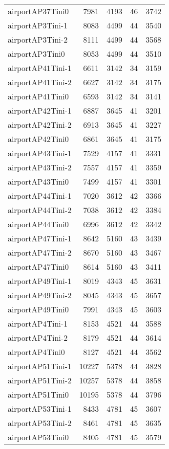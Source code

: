 \begin{longtable}{lrrrr}
airportAP37Tini0 & 7981 & 4193 & 46 & 3742 \\
airportAP3Tini-1 & 8083 & 4499 & 44 & 3540 \\
airportAP3Tini-2 & 8111 & 4499 & 44 & 3568 \\
airportAP3Tini0 & 8053 & 4499 & 44 & 3510 \\
airportAP41Tini-1 & 6611 & 3142 & 34 & 3159 \\
airportAP41Tini-2 & 6627 & 3142 & 34 & 3175 \\
airportAP41Tini0 & 6593 & 3142 & 34 & 3141 \\
airportAP42Tini-1 & 6887 & 3645 & 41 & 3201 \\
airportAP42Tini-2 & 6913 & 3645 & 41 & 3227 \\
airportAP42Tini0 & 6861 & 3645 & 41 & 3175 \\
airportAP43Tini-1 & 7529 & 4157 & 41 & 3331 \\
airportAP43Tini-2 & 7557 & 4157 & 41 & 3359 \\
airportAP43Tini0 & 7499 & 4157 & 41 & 3301 \\
airportAP44Tini-1 & 7020 & 3612 & 42 & 3366 \\
airportAP44Tini-2 & 7038 & 3612 & 42 & 3384 \\
airportAP44Tini0 & 6996 & 3612 & 42 & 3342 \\
airportAP47Tini-1 & 8642 & 5160 & 43 & 3439 \\
airportAP47Tini-2 & 8670 & 5160 & 43 & 3467 \\
airportAP47Tini0 & 8614 & 5160 & 43 & 3411 \\
airportAP49Tini-1 & 8019 & 4343 & 45 & 3631 \\
airportAP49Tini-2 & 8045 & 4343 & 45 & 3657 \\
airportAP49Tini0 & 7991 & 4343 & 45 & 3603 \\
airportAP4Tini-1 & 8153 & 4521 & 44 & 3588 \\
airportAP4Tini-2 & 8179 & 4521 & 44 & 3614 \\
airportAP4Tini0 & 8127 & 4521 & 44 & 3562 \\
airportAP51Tini-1 & 10227 & 5378 & 44 & 3828 \\
airportAP51Tini-2 & 10257 & 5378 & 44 & 3858 \\
airportAP51Tini0 & 10195 & 5378 & 44 & 3796 \\
airportAP53Tini-1 & 8433 & 4781 & 45 & 3607 \\
airportAP53Tini-2 & 8461 & 4781 & 45 & 3635 \\
airportAP53Tini0 & 8405 & 4781 & 45 & 3579 \\

\end{longtable}
